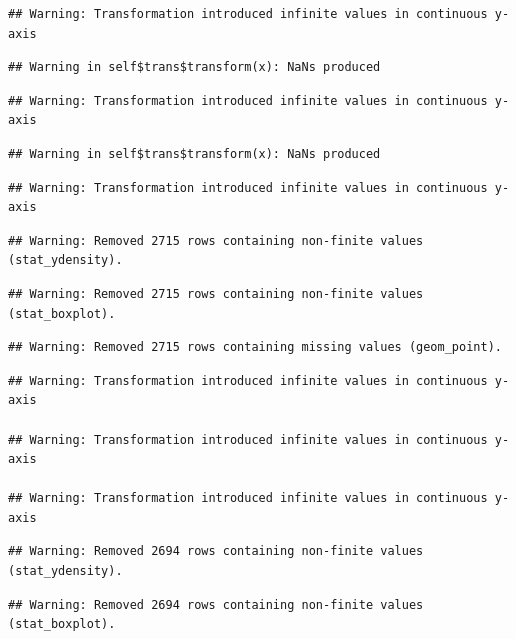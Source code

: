 \documentclass[a4paper,nobind]{templates/ociamthesis}
\begin{document}
\begin{landscape}
\begin{verbatim}
## Warning: Transformation introduced infinite values in continuous y-axis
\end{verbatim}

\begin{verbatim}
## Warning in self$trans$transform(x): NaNs produced
\end{verbatim}

\begin{verbatim}
## Warning: Transformation introduced infinite values in continuous y-axis
\end{verbatim}

\begin{verbatim}
## Warning in self$trans$transform(x): NaNs produced
\end{verbatim}

\begin{verbatim}
## Warning: Transformation introduced infinite values in continuous y-axis
\end{verbatim}

\begin{verbatim}
## Warning: Removed 2715 rows containing non-finite values (stat_ydensity).
\end{verbatim}

\begin{verbatim}
## Warning: Removed 2715 rows containing non-finite values (stat_boxplot).
\end{verbatim}

\begin{verbatim}
## Warning: Removed 2715 rows containing missing values (geom_point).
\end{verbatim}

\begin{verbatim}
## Warning: Transformation introduced infinite values in continuous y-axis

## Warning: Transformation introduced infinite values in continuous y-axis

## Warning: Transformation introduced infinite values in continuous y-axis
\end{verbatim}

\begin{verbatim}
## Warning: Removed 2694 rows containing non-finite values (stat_ydensity).
\end{verbatim}

\begin{verbatim}
## Warning: Removed 2694 rows containing non-finite values (stat_boxplot).
\end{verbatim}


\end{landscape}
\end{document}
